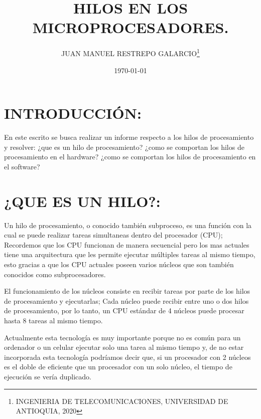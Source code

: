 \documentclass[12pt,letterpaper]{article}
\author{JUAN MANUEL RESTREPO GALARCIO\thanks{INGENIERIA DE TELECOMUNICACIONES, UNIVERSIDAD DE ANTIOQUIA, 2020}}
\title{HILOS EN LOS MICROPROCESADORES.}
\date{\today}
\begin{document}
\maketitle





\section{INTRODUCCIÓN:}

En este escrito se busca realizar un informe respecto a los hilos de procesamiento y resolver: ¿que es un hilo de procesamiento? ¿como se comportan los hilos de procesamiento en el hardware? ¿como se comportan los hilos de procesamiento en el software?



\section{¿QUE ES UN HILO?:}

Un hilo de procesamiento, o conocido también subproceso, es una función con la cual se puede realizar tareas simultaneas dentro del procesador (CPU); Recordemos que los CPU funcionan de manera secuencial pero los mas actuales tiene una arquitectura que les permite ejecutar múltiples tareas al mismo tiempo, esto gracias a que los CPU actuales poseen varios núcleos que son también conocidos como subprocesadores.

El funcionamiento de los núcleos consiste en recibir tareas por parte de los hilos de procesamiento y ejecutarlas; Cada núcleo puede recibir entre uno o dos hilos de procesamiento, por lo tanto, un CPU estándar de 4 núcleos puede procesar hasta 8 tareas al mismo tiempo.

Actualmente esta tecnología es muy importante porque no es común para un ordenador o un celular ejecutar solo una tarea al mismo tiempo y, de no estar incorporada esta tecnología podríamos decir que, si un procesador con 2 núcleos es el doble de eficiente que un procesador con un solo núcleo, el tiempo de ejecución se vería duplicado.
\end{document}
